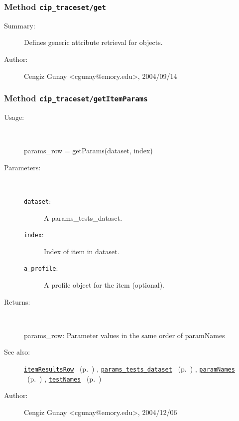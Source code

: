\subsubsection[Method \texttt{get}]{Method \texttt{cip\_traceset/get}}%
%
\label{ref_cip_traceset__get}%
\hypertarget{ref_cip_traceset__get}{}%
\begin{description}
\item[Summary:]Defines generic attribute retrieval for objects.
%
%
%
%
%
%
%
\item[Author:]%
Cengiz Gunay <cgunay@emory.edu>, 2004/09/14
%
\end{description}
\methodline%
\subsubsection[Method \texttt{getItemParams}]{Method \texttt{cip\_traceset/getItemParams}}%
%
\label{ref_cip_traceset__getItemParams}%
\hypertarget{ref_cip_traceset__getItemParams}{}%
\begin{description}
%
\item[Usage:]~%
\begin{lyxcode}%
params\_row = getParams(dataset, index)
%
\end{lyxcode}%
%
%
\item[Parameters:]~
\begin{description}%
\item[\texttt{dataset}:]
 A params\_tests\_dataset.
\item[\texttt{index}:]
 Index of item in dataset.
\item[\texttt{a\_profile}:]
 A profile object for the item (optional).
\end{description}%
%
\item[Returns:
]~

	params\_row: Parameter values in the same order of paramNames
%
%
\item[See also:]%
\hyperlink{ref_itemResultsRow}{\texttt{itemResultsRow}}%
\ (p.~\pageref{ref_itemResultsRow})%
%
, \hyperlink{ref_params_tests_dataset}{\texttt{params\_tests\_dataset}}%
\ (p.~\pageref{ref_params_tests_dataset})%
%
, \hyperlink{ref_paramNames}{\texttt{paramNames}}%
\ (p.~\pageref{ref_paramNames})%
%
, \hyperlink{ref_testNames}{\texttt{testNames}}%
\ (p.~\pageref{ref_testNames})%
%
%
\item[Author:]%
Cengiz Gunay <cgunay@emory.edu>, 2004/12/06
%
\end{description}
\methodline%
